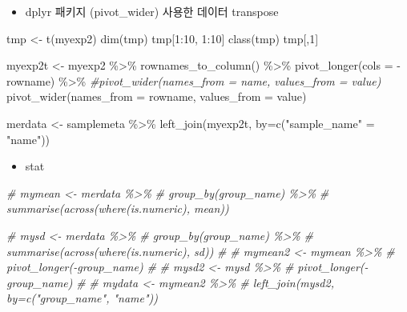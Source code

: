\documentclass[
]{book}
\newenvironment{Shaded}{\begin{snugshade}}{\end{snugshade}}
\newcommand{\AttributeTok}[1]{\textcolor[rgb]{0.77,0.63,0.00}{#1}}
\newcommand{\CommentTok}[1]{\textcolor[rgb]{0.56,0.35,0.01}{\textit{#1}}}
\newcommand{\DecValTok}[1]{\textcolor[rgb]{0.00,0.00,0.81}{#1}}
\newcommand{\FunctionTok}[1]{\textcolor[rgb]{0.00,0.00,0.00}{#1}}
\newcommand{\NormalTok}[1]{#1}
\newcommand{\OtherTok}[1]{\textcolor[rgb]{0.56,0.35,0.01}{#1}}
\newcommand{\SpecialCharTok}[1]{\textcolor[rgb]{0.00,0.00,0.00}{#1}}
\newcommand{\StringTok}[1]{\textcolor[rgb]{0.31,0.60,0.02}{#1}}
\providecommand{\tightlist}{%
  \setlength{\itemsep}{0pt}\setlength{\parskip}{0pt}}
\begin{document}
\begin{itemize}
\tightlist
\item
  dplyr 패키지 (pivot\_wider) 사용한 데이터 transpose
\end{itemize}

\begin{Shaded}
\begin{Highlighting}[]

\NormalTok{tmp }\OtherTok{\textless{}{-}} \FunctionTok{t}\NormalTok{(myexp2)}
\FunctionTok{dim}\NormalTok{(tmp)}
\NormalTok{tmp[}\DecValTok{1}\SpecialCharTok{:}\DecValTok{10}\NormalTok{, }\DecValTok{1}\SpecialCharTok{:}\DecValTok{10}\NormalTok{]}
\FunctionTok{class}\NormalTok{(tmp)}
\NormalTok{tmp[,}\DecValTok{1}\NormalTok{]}


\NormalTok{myexp2t }\OtherTok{\textless{}{-}}\NormalTok{ myexp2 }\SpecialCharTok{\%\textgreater{}\%} 
  \FunctionTok{rownames\_to\_column}\NormalTok{() }\SpecialCharTok{\%\textgreater{}\%} 
  \FunctionTok{pivot\_longer}\NormalTok{(}\AttributeTok{cols =} \SpecialCharTok{{-}}\NormalTok{rowname) }\SpecialCharTok{\%\textgreater{}\%} 
  \CommentTok{\#pivot\_wider(names\_from = name, values\_from = value)}
  \FunctionTok{pivot\_wider}\NormalTok{(}\AttributeTok{names\_from =}\NormalTok{ rowname, }\AttributeTok{values\_from =}\NormalTok{ value)}


\NormalTok{merdata }\OtherTok{\textless{}{-}}\NormalTok{ samplemeta }\SpecialCharTok{\%\textgreater{}\%} 
  \FunctionTok{left\_join}\NormalTok{(myexp2t, }\AttributeTok{by=}\FunctionTok{c}\NormalTok{(}\StringTok{"sample\_name"} \OtherTok{=} \StringTok{"name"}\NormalTok{))}
\end{Highlighting}
\end{Shaded}

\begin{itemize}
\tightlist
\item
  stat
\end{itemize}

\begin{Shaded}
\begin{Highlighting}[]
\CommentTok{\# mymean \textless{}{-} merdata \%\textgreater{}\% }
\CommentTok{\#   group\_by(group\_name) \%\textgreater{}\% }
\CommentTok{\#   summarise(across(where(is.numeric), mean))}

\CommentTok{\# mysd \textless{}{-} merdata \%\textgreater{}\% }
\CommentTok{\#   group\_by(group\_name) \%\textgreater{}\% }
\CommentTok{\#   summarise(across(where(is.numeric), sd))}
\CommentTok{\# }
\CommentTok{\# mymean2 \textless{}{-} mymean \%\textgreater{}\% }
\CommentTok{\#   pivot\_longer({-}group\_name) }
\CommentTok{\# }
\CommentTok{\# mysd2 \textless{}{-} mysd \%\textgreater{}\% }
\CommentTok{\#   pivot\_longer({-}group\_name) }
\CommentTok{\# }
\CommentTok{\# mydata \textless{}{-} mymean2 \%\textgreater{}\% }
\CommentTok{\#   left\_join(mysd2, by=c("group\_name", "name"))}
\end{Highlighting}
\end{Shaded}
\end{document}
